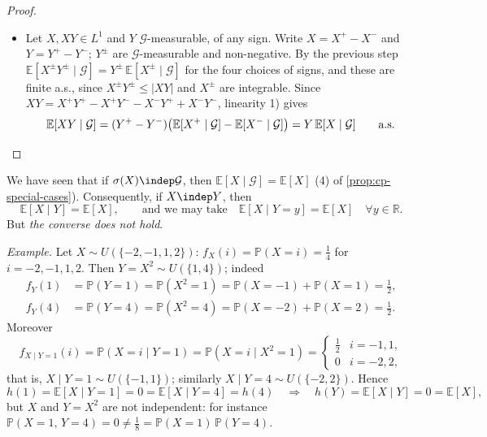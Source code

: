 \begin{proof}
\begin{itemize}
    $Y=0$ and eventually $+\infty$ if $Y>0$.
  \item Let $X,XY\in L^1$ and $Y$ $\mathcal G$-measurable, of any sign. Write $X=X^+-X^-$ and
    $Y=Y^+-Y^-$; $Y^\pm$ are $\mathcal G$-measurable and non-negative. By the previous step
    $\mathbb E[X^\pm Y^\pm\mid\mathcal G]=Y^\pm\,\mathbb E[X^\pm\mid\mathcal G]$ for the four choices
    of signs, and these are finite a.s., since $X^\pm Y^\pm\le|XY|$ and $X^\pm$ are integrable.
    Since $XY=X^+Y^+-X^+Y^--X^-Y^++X^-Y^-$, linearity 1) gives
    \[
      \mathbb E[XY\mid\mathcal G]=(Y^+-Y^-)\big(\mathbb E[X^+\mid\mathcal G]-\mathbb E[X^-\mid\mathcal G]\big)
      =Y\,\mathbb E[X\mid\mathcal G]\qquad\text{a.s.}\qedhere
    \]
\end{itemize}
\end{proof}

\begin{remark}\label{rem:cp-independence}
We have seen that if $\sigma(X)\indep\mathcal G$, then $\mathbb E[X\mid\mathcal G]=\mathbb E[X]$
(4) of \cref{prop:cp-special-cases}). Consequently, if $X\indep Y$, then
\[
  \mathbb E[X\mid Y]=\mathbb E[X],\qquad\text{and we may take}\quad\mathbb E[X\mid Y=y]=\mathbb E[X]\quad\forall y\in\mathbb R .
\]
But \emph{the converse does not hold}.

\emph{Example.} Let $X\sim U(\{-2,-1,1,2\})$: $f_X(i)=\mathbb P(X=i)=\frac14$ for $i=-2,-1,1,2$. Then
$Y=X^2\sim U(\{1,4\})$; indeed
\[
\begin{aligned}
  f_Y(1)&=\mathbb P(Y=1)=\mathbb P(X^2=1)=\mathbb P(X=-1)+\mathbb P(X=1)=\tfrac12,\\
  f_Y(4)&=\mathbb P(Y=4)=\mathbb P(X^2=4)=\mathbb P(X=-2)+\mathbb P(X=2)=\tfrac12 .
\end{aligned}
\]
Moreover
\[
  f_{X\mid Y=1}(i)=\mathbb P(X=i\mid Y=1)=\mathbb P(X=i\mid X^2=1)=
  \begin{cases}\frac12&i=-1,1,\\[0.3ex]0&i=-2,2,\end{cases}
\]
that is, $X\mid Y=1\sim U(\{-1,1\})$; similarly $X\mid Y=4\sim U(\{-2,2\})$. Hence
\[
  h(1)=\mathbb E[X\mid Y=1]=0=\mathbb E[X\mid Y=4]=h(4)
  \quad\Longrightarrow\quad h(Y)=\mathbb E[X\mid Y]=0=\mathbb E[X],
\]
but $X$ and $Y=X^2$ are not independent: for instance
$\mathbb P(X=1,\,Y=4)=0\ne\frac18=\mathbb P(X=1)\,\mathbb P(Y=4)$.
\end{remark}

